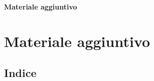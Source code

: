 \documentclass[handout]{beamer}
\begin{document}

\begin{frame}%

%

\vfill
\begin{center}
{\Huge\bfseries\textcolor{structure.fg!55}{Materiale aggiuntivo}}
\end{center}
\vfill

\transboxout
\end{frame}%



\section{Materiale aggiuntivo}


\subsection{Indice}
\end{document}
